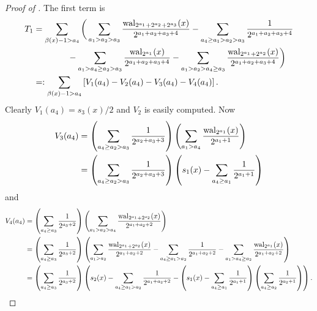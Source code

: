 \documentclass[acmsmall]{acmart}
\begin{document}
\begin{proof}[Proof of ]
    The first term is 
    \begin{align*}
        T_1 &= \sum_{\beta(x)-1 > a_4} \bigg(\sum_{a_1>a_2>a_3} \frac{\mathrm{wal}_{2^{a_1}+2^{a_2}+2^{a_3}}(x)}{2^{a_1+a_2+a_3+4}} -  \sum_{a_4  \geq a_1>a_2>a_3} \frac{1}{2^{a_1+a_2+a_3+4}} \\ & \qquad\qquad  - \sum_{a_1 > a_4 \geq a_2 > a_3} \frac{\mathrm{wal}_{2^{a_1}}(x)}{2^{a_1+a_2+a_3+4}} - \sum_{a_1 > a_2 > a_4 \geq a_3} \frac{\mathrm{wal}_{2^{a_1}+2^{a_2}}(x)}{2^{a_1+a_2+a_3+4}} 
        \bigg) \\
        &=: \sum_{\beta(x)-1 > a_4} \left[V_1(a_4)-V_2(a_4) - V_3(a_4) - V_4(a_4) \right].
    \end{align*}
    Clearly $V_1(a_4) = s_3(x)/2$ and $V_2$ is easily computed. Now
    \begin{align*}
        V_3(a_4) &= \left(\sum_{a_4 \geq a_2 > a_3} \frac{1}{2^{a_2+a_3+3}}\right)\left(\sum_{a_1>a_4} \frac{\mathrm{wal}_{2^{a_1}}(x)}{2^{a_1+1}}\right) \\
        &= \left(\sum_{a_4 \geq a_2 > a_3} \frac{1}{2^{a_2+a_3+3}}\right)\left(s_1(x) - \sum_{a_4 \geq a_1} \frac{1}{2^{a_1+1}} \right)
    \end{align*}
    and 
    \begin{align*}
        V_4(a_4) & = \left(\sum_{a_4 \geq a_3} \frac{1}{2^{a_3+2}}\right)\left(\sum_{a_1>a_2 > a_4} \frac{\mathrm{wal}_{2^{a_1}+2^{a_2}}(x)}{2^{a_1+a_2+2}}\right) \\
        &= \left(\sum_{a_4 \geq a_3} \frac{1}{2^{a_3+2}}\right)\left(\sum_{a_1>a_2} \frac{\mathrm{wal}_{2^{a_1}+2^{a_2}}(x)}{2^{a_1+a_2+2}} - \sum_{a_4 \geq a_1 > a_2} \frac{1}{2^{a_1+a_2+2}} - \sum_{a_1 > a_4 \geq a_2} \frac{\mathrm{wal}_{2^{a_1}}(x)}{2^{a_1+a_2+2}}\right) \\
        &= \left(\sum_{a_4 \geq a_3} \frac{1}{2^{a_3+2}}\right)\left(s_2(x) - \sum_{a_4 \geq a_1 > a_2} \frac{1}{2^{a_1+a_2+2}} - \left(s_1(x) - \sum_{a_4 \geq a_1} \frac{1}{2^{a_1+1}} \right)\left(\sum_{a_4 \geq a_2} \frac{1}{2^{a_2+1}}\right)\right).
    \end{align*}
    

\end{proof}
\end{document}
